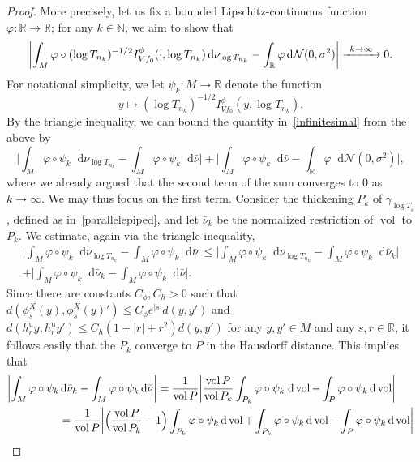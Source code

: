 \documentclass[JEP,XML,SOM,NoEqCountersInSection,Unicode,published]{cedram}
\newcommand\To[1]{\mathchoice{\xrightarrow{\kern4pt#1\kern3pt}}{\stackrel{#1}{\longrightarrow}}{}{}}
\newcommand \R{\mathbb{R}}
\newcommand \N{\mathbb{N}}
\newcommand {\cN}{\mathcal{N}}
\newcommand*{\diff}{\mathop{}\!\mathrm{d}}
\DeclareMathOperator{\vol}{vol}
\theoremstyle{definition}
\begin{document}
\begin{appendix}
\begin{proof}
More precisely, let us fix a bounded Lipschitz-continuous function $\varphi\colon \R\to \R$; for any $k\in \N$, we aim to show that
\begin{equation}
\label{infinitesimal}
\biggl|\int_{M}\varphi\circ (\log{T_{n_k}})^{-1/2}I^{\phi}_{Vf_0}(\cdot,\log{T_{n_k}})\diff \nu_{\log{T_{n_k}}}-\int_{\R}\varphi\diff\cN(0,\sigma^{2})\biggr|\To{k\to\infty}0.
\end{equation}
For notational simplicity, we let $\psi_k\colon M\to \R$ denote the function
\[
y\longmapsto (\log{T_{n_k}})^{-1/2}I_{Vf_0}^{\phi}(y,\log{T_{n_k}}).
\]
By the triangle inequality, we can bound the quantity in~\eqref{infinitesimal} from the above by
\begin{equation*}
\biggl|\int_{M}\varphi\circ \psi_k \diff\nu_{\log{T_{n_k}}}-\int_{M}\varphi\circ \psi_k\diff\bar{\nu} \biggr|
+\biggl|\int_{M}\varphi\circ \psi_k\diff\bar{\nu} -\int_{\R}\varphi\diff\cN(0,\sigma^{2})\biggr|,
\end{equation*}
where we already argued that the second term of the sum converges to $0$ as $k\to\infty$. We may thus focus on the first term. Consider the thickening $P_k$ of $\gamma_{\log{T_{_k}}}$, defined as in~\eqref{parallelepiped}, and let $\bar{\nu}_k$ be the normalized restriction of $\vol$ to $P_k$.
We estimate, again via the triangle inequality,
\begin{multline*}
\biggl|\int_{M}\varphi\circ \psi_k\diff\nu_{\log{T_{n_k}}}-\int_{M}\varphi\circ \psi_k\diff\bar{\nu} \biggr|\leq
\biggl|\int_{M}\varphi\circ \psi_k\diff\nu_{\log{T_{n_k}}}-\int_{M}\varphi\circ \psi_k\diff\bar{\nu}_k \biggr|\\
+
\biggl|\int_{M}\varphi\circ \psi_k\diff\bar{\nu}_k-\int_{M}\varphi\circ \psi_k\diff\bar{\nu} \biggr|.
\end{multline*}
Since there are constants $C_{\phi},C_{h}>0$ such that $d(\phi^{X}_s(y),\phi^X_s(y)')\leq C_{\phi}e^{|s|}d(y,y')$ and $d(h^{\mathrm{u}}_ry,h^{\mathrm{u}}_ry')\leq C_{h}(1+|r|+r^{2})d(y,y')$ for any $y,y' \in M$ and any $s,r\in \R$, it follows easily that the $P_k$ converge to $P$ in the Hausdorff distance. This implies that
\begin{align*}
\biggl|\int_{M}\varphi\circ \psi_k&\diff\bar{\nu}_k-\int_{M}\varphi\circ \psi_k\diff\bar{\nu} \biggr|
=\frac{1}{\vol{P}}\biggl|\frac{\vol{P}}{\vol{P_k}}\int_{P_k}\varphi\circ \psi_k \; \text{d}\vol-\int_{P}\varphi\circ \psi_k\diff\vol\biggr|\\
&=\frac{1}{\vol{P}}\biggl|\Bigl(\frac{\vol{P}}{\vol{P_k}}-1\Bigr)\int_{P_k}\varphi\circ \psi_k\diff\vol+\int_{P_k}\varphi\circ \psi_k\diff\vol-\int_{P}\varphi\circ \psi_k\diff\vol\biggr|\\

\end{align*}
\end{proof}
\end{appendix}
\end{document}
